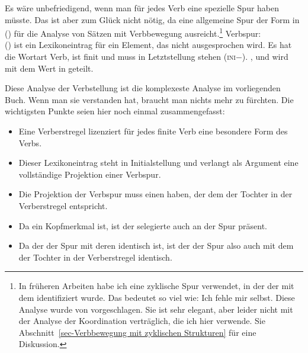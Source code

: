 Es wäre unbefriedigend, wenn man für jedes Verb eine spezielle Spur haben müsste. Das ist aber 
zum Glück nicht nötig, da eine allgemeine Spur der Form in () für die Analyse
von Sätzen mit Verbbewegung ausreicht.\footnote{%
  In früheren Arbeiten \parencites{Mueller2005c}[408]{MuellerOrder2024} habe ich eine zyklische Spur
  verwendet, in der der \localw mit dem \dslw
{}
  identifiziert wurde. Das bedeutet so viel wie: Ich fehle mir selbst. Diese Analyse wurde von
  \citet[207]{Meurers2000b} vorgeschlagen. Sie ist sehr elegant, aber leider nicht mit der Analyse
  der Koordination verträglich, die ich hier verwende. Sie Abschnitt~\ref{sec-Verbbewegung mit zyklischen Strukturen} für eine Diskussion.
}
\eas
Verbspur:\\
\zs
() ist ein Lexikoneintrag für ein Element, das nicht ausgesprochen wird. Es hat die Wortart
Verb, ist finit und muss in Letztstellung stehen (\textsc{ini}$-$). \sprw, \compsw und \contw wird mit dem
Wert in \dsl geteilt.

Diese Analyse der Verbstellung ist die komplexeste Analyse im vorliegenden Buch. Wenn man sie verstanden
hat, braucht man nichts mehr zu fürchten. Die wichtigsten Punkte seien hier noch einmal zusammengefasst:
\begin{itemize}
\item Eine Verberstregel lizenziert für jedes finite Verb eine besondere Form des Verbs.
\item Dieser Lexikoneintrag steht in Initialstellung und verlangt als Argument eine vollständige Projektion
      einer Verbspur.
\item Die Projektion der Verbspur muss einen \dslw haben, der dem \localw der Tochter in der Verberstregel
      entspricht.
\item Da \dsl ein Kopfmerkmal ist, ist der selegierte \dslw auch an der Spur präsent.
\item Da der \dslw der Spur mit deren \localw identisch ist, ist der \localw der Spur also
      auch mit dem \localw der Tochter in der Verberstregel identisch.
\end{itemize}

